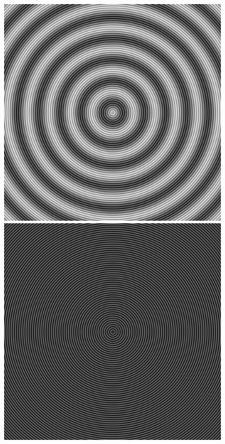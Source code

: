 \documentclass[a4paper,12pt]{report}
\begin{document}
\begin{figure}[!ht]
	\center	
		\includegraphics[scale=0.1]{image/1024_moire.jpg}		
		\includegraphics[scale=0.1]{image/1024_moire_f1.jpg}	

\end{figure}
\end{document}
